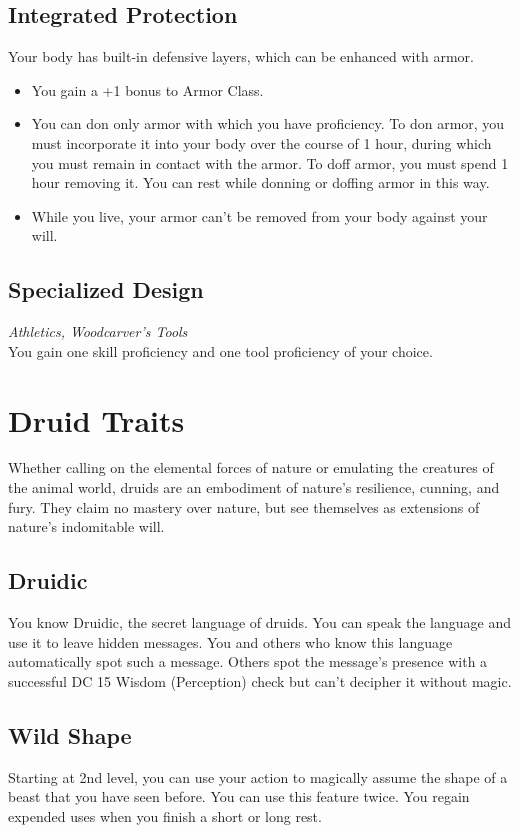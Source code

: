 \documentclass[letterpaper,openany,oneside,twocolumn]{book}
\begin{document}
\subsection*{Integrated Protection}
Your body has built-in defensive layers, which can be enhanced with armor.
\begin{itemize}
	\item You gain a +1 bonus to Armor Class.
	\item You can don only armor with which you have proficiency. To don armor, you must incorporate it into your body over the course of 1 hour, during which you must remain in contact with the armor. To doff armor, you must spend 1 hour removing it. You can rest while donning or doffing armor in this way.
	\item While you live, your armor can't be removed from your body against your will.
\end{itemize}
\subsection*{Specialized Design}
\textit{Athletics, Woodcarver's Tools}\\
You gain one skill proficiency and one tool proficiency of your choice.

\section*{Druid Traits}
Whether calling on the elemental forces of nature or emulating the creatures of the animal world, druids are an embodiment of nature's resilience, cunning, and fury. They claim no mastery over nature, but see themselves as extensions of nature's indomitable will.
\subsection*{Druidic}
You know Druidic, the secret language of druids. You can speak the language and use it to leave hidden messages. You and others who know this language automatically spot such a message. Others spot the message's presence with a successful DC 15 Wisdom (Perception) check but can't decipher it without magic.
\subsection*{Wild Shape}
Starting at 2nd level, you can use your action to magically assume the shape of a beast that you have seen before. You can use this feature twice. You regain expended uses when you finish a short or long rest.
\end{document}
